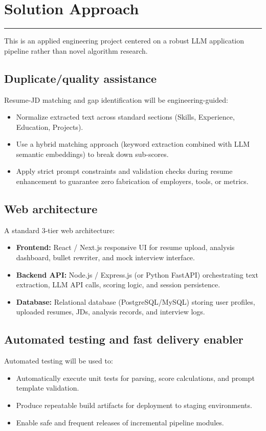 \documentclass[11pt,a4paper]{article}
\newcommand{\BvrSectionRule}{%
  \par\nobreak\vspace{0.25em}%
  \noindent\rule{\linewidth}{0.4pt}%
  \par\nobreak\vspace{0.4em}%
}
\begin{document}
\section{Solution Approach %
}
\BvrSectionRule
This is an applied engineering project centered on a robust
LLM application pipeline rather than novel algorithm research.

\subsection{Duplicate/quality assistance %
}
Resume-JD matching and gap identification will be
engineering-guided:
\begin{itemize}[leftmargin=0.7cm]
    \item Normalize extracted text across standard sections (Skills, Experience, Education, Projects).
    \item Use a hybrid matching approach (keyword extraction combined with LLM semantic embeddings) to break down sub-scores.
    \item Apply strict prompt constraints and validation checks during resume enhancement to guarantee zero fabrication of employers, tools, or metrics.
\end{itemize}

\subsection{Web architecture %
}
A standard 3-tier web architecture:
\begin{itemize}[leftmargin=0.7cm]
    \item \textbf{Frontend:} React / Next.js responsive UI for resume upload, analysis dashboard, bullet rewriter, and mock interview interface.
    \item \textbf{Backend API:} Node.js / Express.js (or Python FastAPI) orchestrating text extraction, LLM API calls, scoring logic, and session persistence.
    \item \textbf{Database:} Relational database (PostgreSQL/MySQL) storing user profiles, uploaded resumes, JDs, analysis records, and interview logs.
\end{itemize}

\subsection{Automated testing and fast delivery enabler}
Automated testing will be used to:
\begin{itemize}[leftmargin=0.7cm]
    \item Automatically execute unit tests for parsing, score calculations, and prompt template validation.
    \item Produce repeatable build artifacts for deployment to staging environments.
    \item Enable safe and frequent releases of incremental pipeline modules.
\end{itemize}
\end{document}

